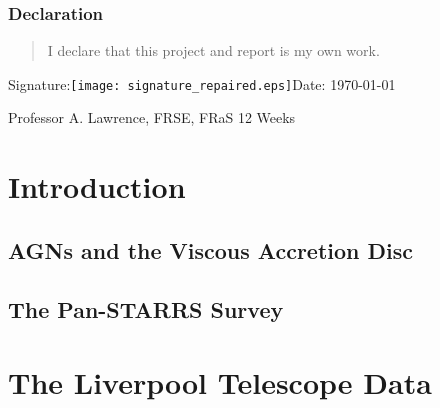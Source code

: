 \documentclass[a4paper,11pt]{article}
\begin{document}
\vspace*{1cm}

\subsubsection*{Declaration}
\begin{quotation}
    I declare that this project and report is my own work.
\end{quotation}

\hspace*{1cm}Signature:\hspace*{1cm}\texttt{[image: signature\_repaired.eps]}\hspace*{1cm}Date: \today

\vfill
{} Professor A. Lawrence, FRSE, FRaS
\hfill
12 Weeks

\newpage
\setcounter{page}{1} %
\tableofcontents
\newpage
\section{Introduction}
\subsection{AGNs and the Viscous Accretion Disc}
\cite{lawrence_2018}
\subsection{The Pan-STARRS Survey}
\cite{bruce_2017}

\section{The Liverpool Telescope Data}
\end{document}
